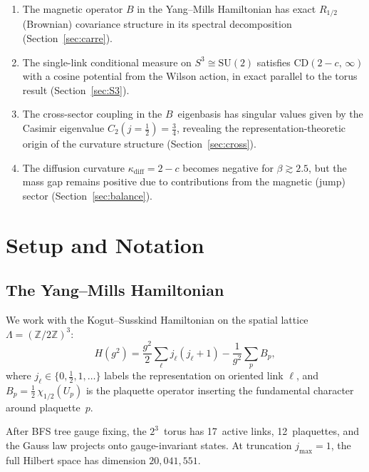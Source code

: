 \documentclass[11pt,a4paper]{article}
\theoremstyle{plain}
\theoremstyle{definition}
\theoremstyle{remark}
\newcommand{\Z}{\mathbb{Z}}
\begin{document}
\begin{enumerate}
\item[(A)] The magnetic operator $B$ in the Yang--Mills Hamiltonian has
  exact $R_{1/2}$ (Brownian) covariance structure in its spectral
  decomposition (Section~\ref{sec:carre}).
\item[(B)] The single-link conditional measure on $S^3 \cong
  \mathrm{SU}(2)$ satisfies $\mathrm{CD}(2-c,\,\infty)$ with a cosine
  potential from the Wilson action, in exact parallel to the
  torus result (Section~\ref{sec:S3}).
\item[(C)] The cross-sector coupling in the $B$~eigenbasis has singular
  values given by the Casimir eigenvalue $C_2(j{=}\tfrac{1}{2}) =
  \tfrac{3}{4}$, revealing the representation-theoretic origin of the
  curvature structure (Section~\ref{sec:cross}).
\item[(D)] The diffusion curvature $\kappa_{\mathrm{diff}} = 2-c$ becomes
  negative for $\beta \gtrsim 2.5$, but the mass gap remains positive
  due to contributions from the magnetic (jump) sector
  (Section~\ref{sec:balance}).
\end{enumerate}

\section{Setup and Notation}

\subsection{The Yang--Mills Hamiltonian}

We work with the Kogut--Susskind Hamiltonian on the spatial lattice
$\Lambda = (\Z/2\Z)^3$:
\begin{equation}\label{eq:H}
  H(g^2) = \frac{g^2}{2}\sum_{\ell} j_\ell(j_\ell+1)
  - \frac{1}{g^2}\sum_p B_p,
\end{equation}
where $j_\ell \in \{0,\tfrac{1}{2},1,\ldots\}$ labels the
representation on oriented link $\ell$, and $B_p = \tfrac{1}{2}\,
\chi_{1/2}(U_p)$ is the plaquette operator inserting the fundamental
character around plaquette~$p$.

After BFS tree gauge fixing, the $2^3$~torus has 17~active links,
12~plaquettes, and the Gauss law projects onto gauge-invariant states.
At truncation $j_{\max}=1$, the full Hilbert space has dimension
$20{,}041{,}551$.
\end{document}
